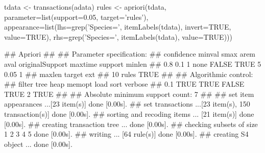\begin{Schunk}
% --begin: "casestudy-assoc-arules-search"
\begin{Sinput}
tdata <- transactions(adata)
rules <- apriori(tdata, 
                 parameter=list(support=0.05,
                                target='rules'),
                 appearance=list(lhs=grep('Species=', itemLabels(tdata), invert=TRUE, value=TRUE),
                                 rhs=grep('Species=', itemLabels(tdata), value=TRUE)))
\end{Sinput}
\begin{Soutput}
## Apriori
## 
## Parameter specification:
##  confidence minval smax arem  aval originalSupport maxtime support minlen
##         0.8    0.1    1 none FALSE            TRUE       5    0.05      1
##  maxlen target  ext
##      10  rules TRUE
## 
## Algorithmic control:
##  filter tree heap memopt load sort verbose
##     0.1 TRUE TRUE  FALSE TRUE    2    TRUE
## 
## Absolute minimum support count: 7 
## 
## set item appearances ...[23 item(s)] done [0.00s].
## set transactions ...[23 item(s), 150 transaction(s)] done [0.00s].
## sorting and recoding items ... [21 item(s)] done [0.00s].
## creating transaction tree ... done [0.00s].
## checking subsets of size 1 2 3 4 5 done [0.00s].
## writing ... [64 rule(s)] done [0.00s].
## creating S4 object  ... done [0.00s].
\end{Soutput}
%
% --end: "casestudy-assoc-arules-search"
\end{Schunk}
